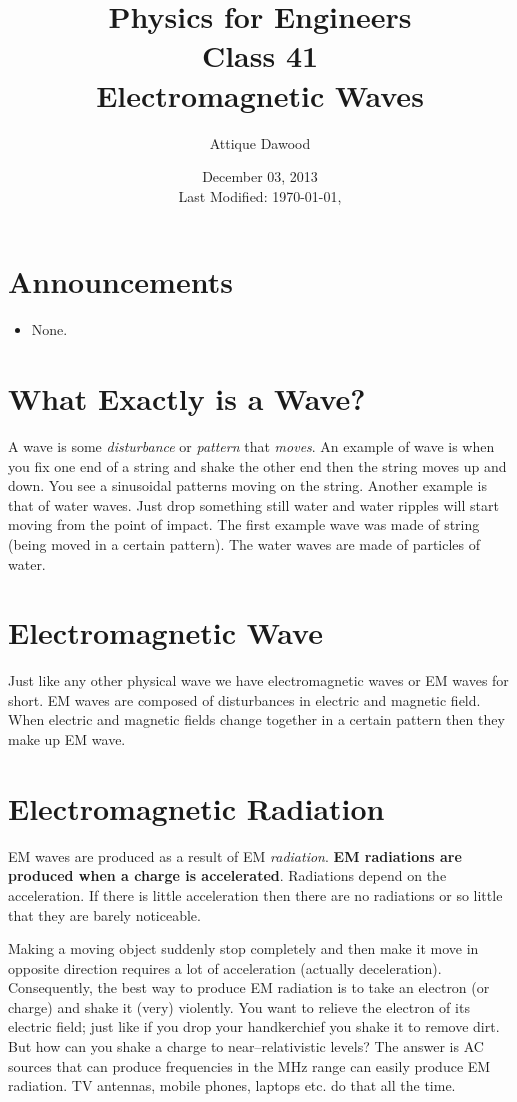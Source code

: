 \documentclass[12pt,a4paper]{article}
\title{\vspace{-3cm}Physics for Engineers\\Class 41\\Electromagnetic Waves}
\author{Attique Dawood}
\date{December 03, 2013\\[0.2cm] Last Modified: \today, \currenttime}
\begin{document}
\maketitle
\section{Announcements}
\begin{itemize}
\item None.
\end{itemize}
\section{What Exactly is a Wave?}
A wave is some \textit{disturbance} or \textit{pattern} that \textit{moves}. An example of wave is when you fix one end of a string and shake the other end then the string moves up and down. You see a sinusoidal patterns moving on the string. Another example is that of water waves. Just drop something still water and water ripples will start moving from the point of impact. The first example wave was made of string (being moved in a certain pattern). The water waves are made of particles of water.
\section{Electromagnetic Wave}
Just like any other physical wave we have electromagnetic waves or EM waves for short. EM waves are composed of disturbances in electric and magnetic field. When electric and magnetic fields change together in a certain pattern then they make up EM wave.
\section{Electromagnetic Radiation}
EM waves are produced as a result of EM \textit{radiation}. \textbf{EM radiations are produced when a charge is accelerated}. Radiations depend on the acceleration. If there is little acceleration then there are no radiations or so little that they are barely noticeable.

Making a moving object suddenly stop completely and then make it move in opposite direction requires a lot of acceleration (actually deceleration). Consequently, the best way to produce EM radiation is to take an electron (or charge) and shake it (very) violently. You want to relieve the electron of its electric field; just like if you drop your handkerchief you shake it to remove dirt. But how can you shake a charge to near--relativistic levels? The answer is AC sources that can produce frequencies in the MHz range can easily produce EM radiation. TV antennas, mobile phones, laptops etc. do that all the time.
\end{document}
